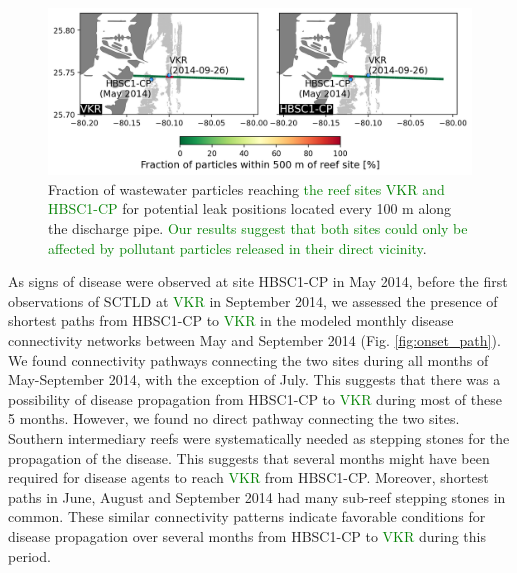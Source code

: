 \documentclass[preprint,12pt,authoryear]{elsarticle}
\newcommand{\modif}[1]{\textcolor{green}{#1}}
\begin{document}
\begin{figure}
	\centering
	\includegraphics[width=.98\textwidth]{figures/fig_pipeline_new.png}
	\caption{Fraction of wastewater particles reaching \modif{the reef sites VKR and HBSC1-CP} for potential leak positions located every 100 m along the discharge pipe. \modif{Our results suggest that both sites could only be affected by pollutant particles released in their direct vicinity}.}
	\label{fig:onset_pipe}
\end{figure}

As signs of disease were observed at site HBSC1-CP in May 2014, before the first observations of SCTLD at \modif{VKR} in September 2014, we assessed the presence of shortest paths from HBSC1-CP to \modif{VKR} in the modeled monthly disease connectivity networks between May and September 2014 (Fig. \ref{fig:onset_path}). We found connectivity pathways connecting the two sites during all months of May-September 2014, with the exception of July. This suggests that there was a possibility of disease propagation from HBSC1-CP to \modif{VKR} during most of these 5 months. However, we found no direct pathway connecting the two sites. Southern intermediary reefs were systematically needed as stepping stones for the propagation of the disease. This suggests that several months might have been required for disease agents to reach \modif{VKR} from HBSC1-CP. Moreover, shortest paths in June, August and September 2014 had many sub-reef stepping stones in common. These similar connectivity patterns indicate favorable conditions for disease propagation over several months from HBSC1-CP to \modif{VKR} during this period. 
\end{document}

